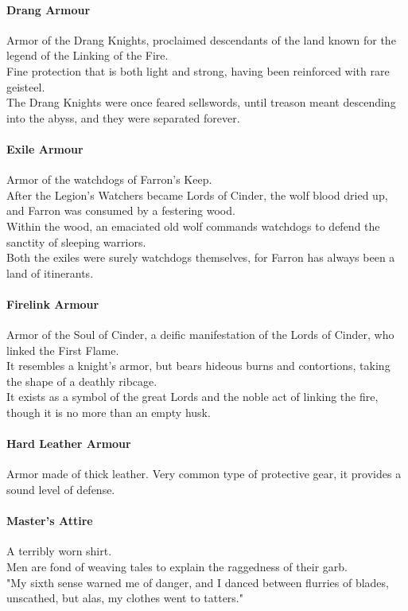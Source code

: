 \documentclass[twocolumn,a4paper]{article}
\begin{document}
\paragraph{Drang Armour}
Armor of the Drang Knights, proclaimed descendants of the land known for the legend of the Linking of the Fire.\\
Fine protection that is both light and strong, having been reinforced with rare geisteel.\\
The Drang Knights were once feared sellswords, until treason meant descending into the abyss, and they were separated forever.
\paragraph{Exile Armour}
Armor of the watchdogs of Farron's Keep.\\
After the Legion's Watchers became Lords of Cinder, the wolf blood dried up, and Farron was consumed by a festering wood.\\
Within the wood, an emaciated old wolf commands watchdogs to defend the sanctity of sleeping warriors.\\
Both the exiles were surely watchdogs themselves, for Farron has always been a land of itinerants.
\paragraph{Firelink Armour}
Armor of the Soul of Cinder, a deific manifestation of the Lords of Cinder, who linked the First Flame.\\
It resembles a knight's armor, but bears hideous burns and contortions, taking the shape of a deathly ribcage.\\
It exists as a symbol of the great Lords and the noble act of linking the fire, though it is no more than an empty husk.
\paragraph{Hard Leather Armour}
Armor made of thick leather. Very common type of protective gear, it provides a sound level of defense.
\paragraph{Master’s Attire}
A terribly worn shirt.\\
Men are fond of weaving tales to explain the raggedness of their garb.\\
"My sixth sense warned me of danger, and I danced between flurries of blades, unscathed, but alas, my clothes went to tatters."
\end{document}
